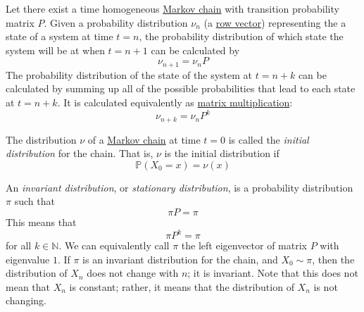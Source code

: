  \begin{theorem}
    \label{thm:finite-dimensional-distributions-of-a-markov}
    Let there exist a time homogeneous \hyperref[def:markov-chain]{Markov chain} with transition probability matrix $P$. Given a probability distribution $\nu_n$ (a \hyperref[lin-def:row-vector]{row vector}) representing the a state of a system at time $t=n$, the probability distribution of which state the system will be at when $t=n+1$ can be calculated by 
    \begin{equation}
      \nu_{n+1} = \nu_n P
    \end{equation}
    The probability distribution of the state of the system at $t=n+k$ can be calculated by summing up all of the possible probabilities that lead to each state at $t=n+k$. It is calculated equivalently as \hyperref[lin-def:matrix-multiplication]{matrix multiplication}: 
    \begin{equation}
      \nu_{n+k} = \nu_n P^k
    \end{equation}
  \end{theorem}

  \begin{definition}
    \label{def:initial-distribution}
    The distribution $\nu$ of a \hyperref[def:markov-chain]{Markov chain} at time $t=0$ is called the \textit{initial distribution} for the chain. That is, $\nu$ is the initial distribution if 
    \begin{equation}
      \mathbb{P}(X_0 = x) = \nu(x)
    \end{equation}
  \end{definition}

  \begin{definition}
    \label{def:stationary-distribution}
    An \textit{invariant distribution}, or \textit{stationary distribution}, is a probability distribution $\pi$ such that 
    \begin{equation}
      \pi P = \pi
    \end{equation}
    This means that 
    \begin{equation}
      \pi P^k = \pi
    \end{equation}
    for all $k \in \mathbb{N}$. We can equivalently call $\pi$ the left eigenvector of matrix $P$ with eigenvalue $1$. If $\pi$ is an invariant distribution for the chain, and $X_0 \sim \pi$, then the distribution of $X_n$ does not change with $n$; it is invariant. Note that this does not mean that $X_n$ is constant; rather, it means that the distribution of $X_n$ is not changing. 
  \end{definition}

